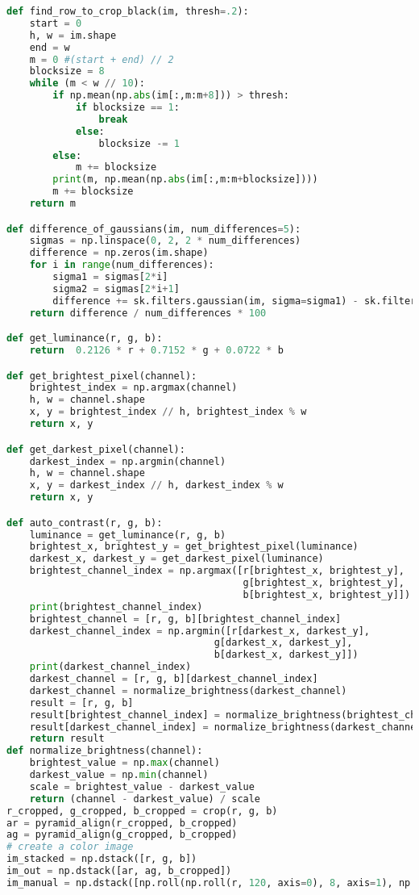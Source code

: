 \documentclass[withoutpreface,bwprint]{cumcmthesis} %
\begin{document}
\begin{appendices}
\begin{lstlisting}[language=python]
def find_row_to_crop_black(im, thresh=.2):
	start = 0
	h, w = im.shape
	end = w
	m = 0 #(start + end) // 2
	blocksize = 8
	while (m < w // 10):
		if np.mean(np.abs(im[:,m:m+8])) > thresh:
			if blocksize == 1:
				break
			else:
				blocksize -= 1
		else:
			m += blocksize
		print(m, np.mean(np.abs(im[:,m:m+blocksize])))
		m += blocksize
	return m

def difference_of_gaussians(im, num_differences=5):
	sigmas = np.linspace(0, 2, 2 * num_differences)
	difference = np.zeros(im.shape)
	for i in range(num_differences):
		sigma1 = sigmas[2*i]
		sigma2 = sigmas[2*i+1]
		difference += sk.filters.gaussian(im, sigma=sigma1) - sk.filters.gaussian(im, sigma=sigma2)
	return difference / num_differences * 100

def get_luminance(r, g, b):
	return  0.2126 * r + 0.7152 * g + 0.0722 * b

def get_brightest_pixel(channel):
	brightest_index = np.argmax(channel)
	h, w = channel.shape
	x, y = brightest_index // h, brightest_index % w
	return x, y

def get_darkest_pixel(channel):
	darkest_index = np.argmin(channel)
	h, w = channel.shape
	x, y = darkest_index // h, darkest_index % w
	return x, y

def auto_contrast(r, g, b):
	luminance = get_luminance(r, g, b)
	brightest_x, brightest_y = get_brightest_pixel(luminance)
	darkest_x, darkest_y = get_darkest_pixel(luminance)
	brightest_channel_index = np.argmax([r[brightest_x, brightest_y], 
										 g[brightest_x, brightest_y],
										 b[brightest_x, brightest_y]])
	print(brightest_channel_index)
	brightest_channel = [r, g, b][brightest_channel_index]
	darkest_channel_index = np.argmin([r[darkest_x, darkest_y], 
									g[darkest_x, darkest_y],
									b[darkest_x, darkest_y]])
	print(darkest_channel_index)
	darkest_channel = [r, g, b][darkest_channel_index]
	darkest_channel = normalize_brightness(darkest_channel)
	result = [r, g, b]
	result[brightest_channel_index] = normalize_brightness(brightest_channel)
	result[darkest_channel_index] = normalize_brightness(darkest_channel)
	return result
def normalize_brightness(channel):
	brightest_value = np.max(channel)
	darkest_value = np.min(channel)
	scale = brightest_value - darkest_value
    return (channel - darkest_value) / scale
r_cropped, g_cropped, b_cropped = crop(r, g, b)
ar = pyramid_align(r_cropped, b_cropped)
ag = pyramid_align(g_cropped, b_cropped)
# create a color image
im_stacked = np.dstack([r, g, b])
im_out = np.dstack([ar, ag, b_cropped])
im_manual = np.dstack([np.roll(np.roll(r, 120, axis=0), 8, axis=1), np.roll(np.roll(g, 50, axis=0), 30, axis=1), b])


\end{lstlisting}
\end{appendices}
\end{document}

